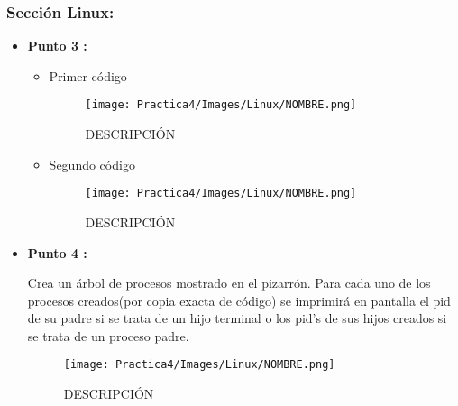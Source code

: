 \documentclass[12pt]{article}
\begin{document}
    		\subsubsection{Sección Linux:}
    		\begin{itemize}
                \item[\Checkmark] \textbf{Punto 3 :}
                    \begin{itemize}
                        \item Primer código 
                           \begin{figure}[h!]
                                \centering
                                \texttt{[image: Practica4/Images/Linux/NOMBRE.png]}
                                \caption{DESCRIPCIÓN}
                            \end{figure}


                        \item Segundo código
                            \begin{figure}[h!]
                                \centering
                                \texttt{[image: Practica4/Images/Linux/NOMBRE.png]}
                                \caption{DESCRIPCIÓN}
                            \end{figure}

                    \end{itemize}

                \item[\Checkmark] \textbf{Punto 4 :}

                    Crea un árbol de procesos mostrado en el pizarrón. Para cada uno de los procesos creados(por copia exacta de código) se imprimirá en pantalla el pid de su padre si se trata de un hijo terminal o los pid's de sus hijos creados si se trata de un proceso padre. 

                    \begin{figure}[h!]
                        \centering
                        \texttt{[image: Practica4/Images/Linux/NOMBRE.png]}
                        \caption{DESCRIPCIÓN}
                    \end{figure}


\end{itemize}
\end{document}
